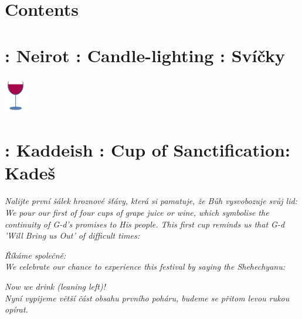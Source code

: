 \documentclass[a5paper,10pt]{memoir}
\begin{document}
\section{Contents}
\ContentsColumnar
%
\vspace*{-4ex}
\section{ : Neirot : Candle-lighting : Svíčky}

\Neirot
\vspace*{2ex}
\hfill\includegraphics[width=10mm]{cup}
\vspace*{-15ex}  %
		
\section{ : Kaddeish : Cup of Sanctification: Kadeš}
\begin{paracol}{2}
	{\textit{Nalijte první šálek hroznové šťávy, která si pamatuje, že Bůh vysvobozuje svůj lid:} \vspace*{2ex}\\
	\color{midblue}\textit{We pour our first of four cups of grape juice or wine, which symbolise the continuity of G-d's promises to His people. This first cup reminds us that G-d 'Will Bring us Out' of difficult times:}}
\end{paracol}
\Kaddeish
\textit{Říkáme společně:}
\\
\color{midblue}\textit{We celebrate our chance to experience this festival by saying the Shehechyanu:}
\color{black}
\Shehechyanu
\begin{center}
	\textit{\centering \color{midblue} Now we drink (leaning left)!} \\
	\textit{Nyní  vypijeme větší část obsahu prvního poháru, budeme se přitom levou rukou opírat.}
	\end{center}
\vspace*{-2ex}
\end{document}
